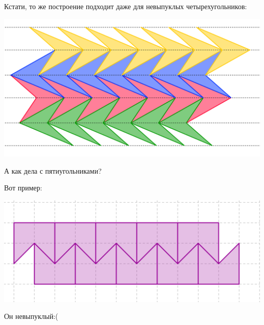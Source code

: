 \documentclass{beamer}
\begin{document}
\begin{frame}
Кстати, то же построение подходит даже для невыпуклых четырехугольников:

\begin{center}
\includegraphics[width=\textwidth]{4-2.png}
\end{center}

\end{frame}

\begin{frame}
А как дела с пятиугольниками?

\medskip

\pause

Вот пример:

\begin{center}
\includegraphics[width=\textwidth]{5-1.png}
\end{center}

\pause

\medskip

Он невыпуклый:(

\end{frame}
\end{document}
